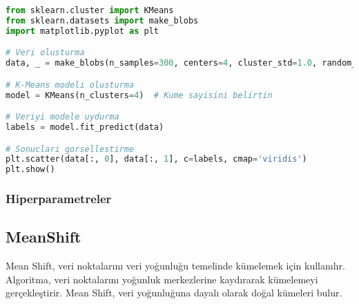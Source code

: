 \begin{lstlisting}[language=Python, caption=Scikit-learn'de KMeans örneği.]
from sklearn.cluster import KMeans
from sklearn.datasets import make_blobs
import matplotlib.pyplot as plt

# Veri olusturma
data, _ = make_blobs(n_samples=300, centers=4, cluster_std=1.0, random_state=42)

# K-Means modeli olusturma
model = KMeans(n_clusters=4)  # Kume sayisini belirtin

# Veriyi modele uydurma
labels = model.fit_predict(data)

# Sonuclari gorsellestirme
plt.scatter(data[:, 0], data[:, 1], c=labels, cmap='viridis')
plt.show()
\end{lstlisting}

\subsubsection{Hiperparametreler}
\begin{table}[h]
\centering
{\scriptsize\renewcommand{\arraystretch}{0.4}
{}}
\end{table}

\subsection{MeanShift}
Mean Shift, veri noktalarını veri yoğunluğu temelinde kümelemek için kullanılır. Algoritma, veri noktalarını yoğunluk merkezlerine kaydırarak kümelemeyi gerçekleştirir. Mean Shift, veri yoğunluğuna dayalı olarak doğal kümeleri bulur.

